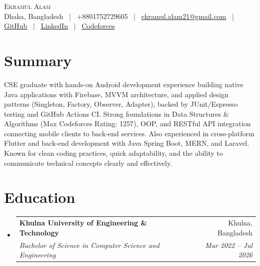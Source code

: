\documentclass[letterpaper,10.5pt]{article}
\makeatletter
\newcommand{\resumeSubheading}[4]{
  \vspace{-2pt}\item
    \begin{tabular*}{\textwidth}[t]{l@{\extracolsep{\fill}}r}
      \textbf{#1} & #2 \\
      \textit{\small#3} & \textit{\small #4} \\
    \end{tabular*}\vspace{-7pt}
}
\newcommand{\resumeSubHeadingListStart}{\begin{itemize}[leftmargin=0.0in, label={}]}
\newcommand{\resumeSubHeadingListEnd}{\end{itemize}}
\makeatother
\begin{document}
\begin{center}
    {\Huge \scshape Ekramul Alam} \\ \vspace{4pt}
    \small Dhaka, Bangladesh ~$|$~ +8801752729605 ~$|$~
    \href{mailto:ekramul.alam21@gmail.com}{ekramul.alam21@gmail.com} ~$|$~
    \href{https://github.com/Apn7}{\underline{GitHub}} ~$|$~
    \href{https://www.linkedin.com/in/ekramul-alam-525659255/}{\underline{LinkedIn}} ~$|$~
    \href{https://codeforces.com/profile/Apn7}{\underline{Codeforces}}
    \vspace{-6pt}
\end{center}

\section{Summary}
\small{CSE graduate with hands-on Android development experience building native Java applications with Firebase, MVVM architecture, and applied design patterns (Singleton, Factory, Observer, Adapter), backed by JUnit/Espresso testing and GitHub Actions CI. Strong foundations in Data Structures \& Algorithms (Max Codeforces Rating: 1257), OOP, and RESTful API integration connecting mobile clients to back-end services. Also experienced in cross-platform Flutter and back-end development with Java Spring Boot, MERN, and Laravel. Known for clean coding practices, quick adaptability, and the ability to communicate technical concepts clearly and effectively.}
\vspace{-4pt}

\section{Education}
  \resumeSubHeadingListStart
    \resumeSubheading
      {Khulna University of Engineering \& Technology}{Khulna, Bangladesh}
      {Bachelor of Science in Computer Science and Engineering}{Mar 2022 -- Jul 2026}
  \resumeSubHeadingListEnd
\vspace{-6pt}

\end{document}
